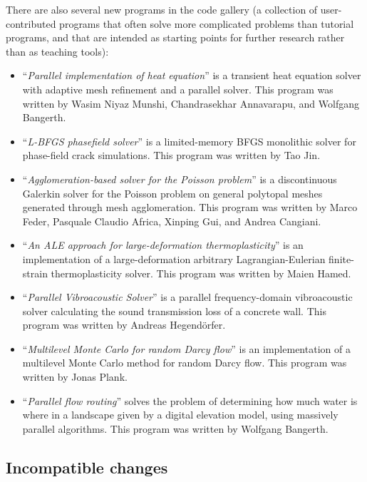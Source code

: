 \documentclass{ansarticle-preprint}
\begin{document}
There are also several new programs in the code gallery (a collection of
user-contributed programs that often solve more complicated problems
than tutorial programs, and that are intended as starting points for further
research rather than as teaching tools):
\begin{itemize}
\item ``\textit{Parallel implementation of heat equation}'' is a transient heat
  equation solver with adaptive mesh refinement and a parallel solver.
  This program was written by Wasim Niyaz Munshi,
  Chandrasekhar Annavarapu, and Wolfgang Bangerth.
\item
  ``\textit{L-BFGS phasefield solver}'' is a limited-memory BFGS
  monolithic solver for phase-field crack simulations. This program was written
  by Tao Jin.
\item
  ``\textit{Agglomeration-based solver for the Poisson problem}'' is a
  discontinuous Galerkin solver for the Poisson problem on general
  polytopal meshes generated through mesh agglomeration. This program
  was written by Marco Feder, Pasquale Claudio Africa, Xinping Gui, and
  Andrea Cangiani.
\item
  ``\textit{An ALE approach for large-deformation thermoplasticity}''
  is an implementation of a large-deformation arbitrary
  Lagrangian-Eulerian finite-strain thermoplasticity solver. This
  program was written by Maien Hamed.
\item
  ``\textit{Parallel Vibroacoustic Solver}'' is a parallel
  frequency-domain vibroacoustic solver calculating the sound
  transmission loss of a concrete wall. This program was written by
  Andreas Hegend{\"o}rfer.
\item
  ``\textit{Multilevel Monte Carlo for random Darcy flow}'' is an
  implementation of a multilevel Monte Carlo method for random Darcy
  flow. This program was written by Jonas Plank.
\item
  ``\textit{Parallel flow routing}'' solves the problem of determining
  how much water is where in a landscape given by a digital elevation
  model, using massively parallel algorithms. This program was written
  by Wolfgang Bangerth.
\end{itemize}


\subsection{Incompatible changes}\label{subsec:deprecated}
\end{document}
